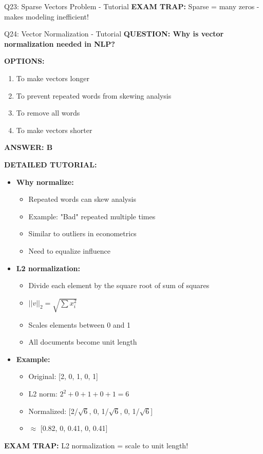 \documentclass[8pt]{beamer}
\begin{document}
\begin{frame}{Q23: Sparse Vectors Problem - Tutorial}
		\textcolor{myred}{\textbf{EXAM TRAP:}} Sparse = \textcolor{myblue}{many zeros} - makes modeling inefficient!
	\end{frame}
	
	\begin{frame}{Q24: Vector Normalization - Tutorial}
		\fontsize{6.5}{7.5}\selectfont
		\textbf{QUESTION: Why is vector normalization needed in NLP?}
		
		\vspace{0.1cm}
		\textbf{OPTIONS:}
		\begin{enumerate}
			\item To make vectors longer
			\item To prevent repeated words from skewing analysis
			\item To remove all words
			\item To make vectors shorter
		\end{enumerate}
		
		\vspace{0.1cm}
		\textcolor{myblue}{\textbf{ANSWER: B}}
		
		\vspace{0.1cm}
		\textbf{DETAILED TUTORIAL:}
		\begin{itemize}
			\item \textbf{Why normalize:}
			\begin{itemize}
				\item Repeated words can skew analysis
				\item Example: "Bad" repeated multiple times
				\item Similar to outliers in econometrics
				\item Need to equalize influence
			\end{itemize}
			\item \textbf{L2 normalization:}
			\begin{itemize}
				\item Divide each element by the square root of sum of squares
				\item $||v||_2 = \sqrt{\sum x_i^2}$
				\item Scales elements between 0 and 1
				\item All documents become unit length
			\end{itemize}
			\item \textbf{Example:}
			\begin{itemize}
				\item Original: [2, 0, 1, 0, 1]
				\item L2 norm: $2^2 + 0 + 1 + 0 + 1 = 6$
				\item Normalized: [2/$\sqrt{6}$, 0, 1/$\sqrt{6}$, 0, 1/$\sqrt{6}$]
				\item $\approx$ [0.82, 0, 0.41, 0, 0.41]
			\end{itemize}
		\end{itemize}
		
		\textcolor{myred}{\textbf{EXAM TRAP:}} L2 normalization = \textcolor{myblue}{scale to unit length}!
	\end{frame}
	
\end{document}
